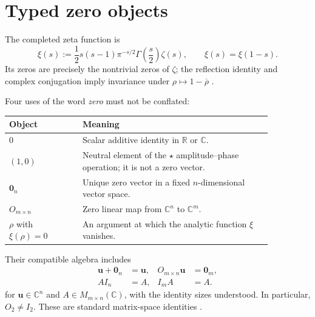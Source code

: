 \documentclass[11pt]{article}
\newcommand{\vzero}{\mathbf 0}
\begin{document}
\section{Typed zero objects}
The completed zeta function is
\begin{equation}\label{eq:completed-zeta}
 \xi(s):=\frac12s(s-1)\pi^{-s/2}\Gamma\!\left(\frac{s}{2}\right)\zeta(s),
 \qquad \xi(s)=\xi(1-s).
\end{equation}
Its zeros are precisely the nontrivial zeros of $\zeta$; the reflection identity and complex
conjugation imply invariance under $\rho\mapsto1-\overline\rho$
\cite{Titchmarsh,DLMFreflection,DLMFzeros}.

Four uses of the word \emph{zero} must not be conflated:
\begin{center}
\begin{tabular}{p{0.24\linewidth}p{0.62\linewidth}}
\toprule
Object & Meaning\\
\midrule
$0$ & Scalar additive identity in $\mathbb R$ or $\mathbb C$.\\
$(1,0)$ & Neutral element of the $\star$ amplitude--phase operation; it is not a zero vector.\\
$\vzero_n$ & Unique zero vector in a fixed $n$-dimensional vector space.\\
$O_{m\times n}$ & Zero linear map from $\mathbb C^n$ to $\mathbb C^m$.\\
$\rho$ with $\xi(\rho)=0$ & An argument at which the analytic function $\xi$ vanishes.\\
\bottomrule
\end{tabular}
\end{center}
Their compatible algebra includes
\begin{align}\label{eq:zero-identities}
 \mathbf u+\vzero_n&=\mathbf u,&
 O_{m\times n}\mathbf u&=\vzero_m,\\
 AI_n&=A,& I_mA&=A.
\end{align}
for $\mathbf u\in\mathbb C^n$ and $A\in M_{m\times n}(\mathbb C)$, with the identity sizes
understood.  In particular, $O_2\ne I_2$.  These are standard matrix-space identities
\cite{HornJohnson}.
\end{document}
